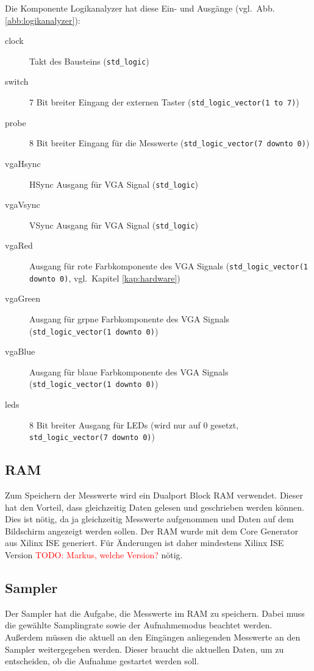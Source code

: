 \documentclass[IN,ngerman,utf8,12pt]{tumbook}
\newcommand\todo[1]{\textcolor{red}{TODO: #1}}
\newcommand{\vgl}{vgl.\ }
\begin{document}
Die Komponente Logikanalyzer hat diese Ein- und Ausgänge (\vgl Abb. \ref{abb:logikanalyzer}):
\begin{description}
    \item[clock] Takt des Bausteins (\texttt{std\_logic})
    \item[switch] 7 Bit breiter Eingang der externen Taster (\texttt{std\_logic\_vector(1 to 7)})
    \item[probe] 8 Bit breiter Eingang für die Messwerte (\texttt{std\_logic\_vector(7 downto 0)})
    \item[vgaHsync] HSync Ausgang für VGA Signal (\texttt{std\_logic})
    \item[vgaVsync] VSync Ausgang für VGA Signal (\texttt{std\_logic})
    \item[vgaRed] Ausgang für rote Farbkomponente des VGA Signals (\texttt{std\_logic\_vector(1 downto 0)}, \vgl Kapitel \ref{kap:hardware})
    \item[vgaGreen] Ausgang für grpne Farbkomponente des VGA Signals (\texttt{std\_logic\_vector(1 downto 0)})
    \item[vgaBlue] Ausgang für blaue Farbkomponente des VGA Signals (\texttt{std\_logic\_vector(1 downto 0)})
    \item[leds] 8 Bit breiter Ausgang für LEDs (wird nur auf 0 gesetzt, \texttt{std\_logic\_vector(7 downto 0)})
\end{description}

\subsection{RAM}

Zum Speichern der Messwerte wird ein Dualport Block RAM verwendet.
Dieser hat den Vorteil, dass gleichzeitig Daten gelesen und geschrieben werden können.
Dies ist nötig, da ja gleichzeitig Messwerte aufgenommen und Daten auf dem Bildschirm angezeigt werden sollen.
Der RAM wurde mit dem Core Generator aus Xilinx ISE generiert.
Für Änderungen ist daher mindestens Xilinx ISE Version \todo{Markus, welche Version?} nötig.

\subsection{Sampler}
\label{kap:sampler}

Der Sampler hat die Aufgabe, die Messwerte im RAM zu speichern.
Dabei muss die gewählte Samplingrate sowie der Aufnahmemodus beachtet werden.
Außerdem müssen die aktuell an den Eingängen anliegenden Messwerte an den Sampler weitergegeben werden.
Dieser braucht die aktuellen Daten, um zu entscheiden, ob die Aufnahme gestartet werden soll.
\end{document}
